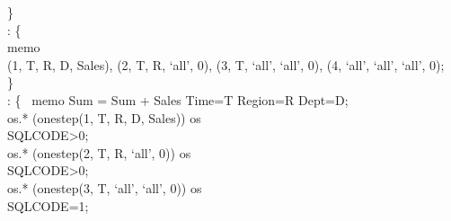 {{\begin{algorithm}[!htb]
\begin{algorithmic}[1]
      \hspace{.3cm}\} \\
      \STATE\hspace{.3cm}: \{ \\
      \STATE{}\hspace{.6cm}  memo \\
      \hspace{.8cm} (1, T, R, D, Sales), (2, T, R, `all', 0), (3, T, `all', `all', 0), (4, `all', `all', `all', 0);\\
      \hspace{.3cm}\}\\
      \STATE\hspace{.3cm}: \{\ %
      \STATE{}\hspace{.6cm} memo  Sum = Sum + Sales  Time=T  Region=R  Dept=D;\\
      \STATE{}\hspace{.6cm}    os.*  (onestep(1, T, R, D, Sales))  os\\
      \hspace{.8cm} SQLCODE>0;\\
      \STATE\hspace{.6cm}    os.*  (onestep(2, T, R, `all', 0))  os\\
      \hspace{.8cm} SQLCODE>0;\\
      \STATE\hspace{.6cm}    os.*  (onestep(3, T, `all', `all', 0))  os\\
      \hspace{.8cm} SQLCODE=1;\\

\end{algorithmic}
\end{algorithm}}}
